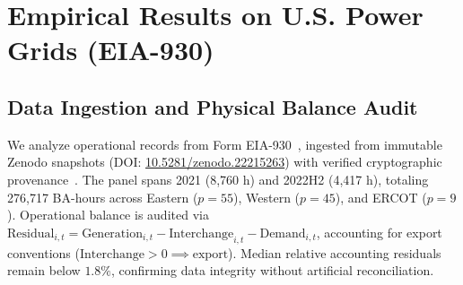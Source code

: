 \documentclass[10pt,twocolumn,journal]{article}
\begin{document}
\begin{table}[t]
\centering
\footnotesize
\renewcommand{\arraystretch}{0.90}
\setlength{\tabcolsep}{3.0pt}
\caption{\textbf{Comparative Baseline Benchmark on Dynamic Scale Transitions ($R=100$).} RMSE and exact $q_{90}$ accuracy comparing Proposed DCD ($h=36, N_{\text{eff}} \approx 128$) against Sliding PCA and Sliding Unregularized Spectrum ($w_{\text{len}}=128$). Benchmark DGP-K is a frozen hold-out ($p=10, 5 \to 2 \to 1$).}
\label{tab:baseline_comparison}
\end{table}

\section{Empirical Results on U.S. Power Grids (EIA-930)}

\subsection{Data Ingestion and Physical Balance Audit}
We analyze operational records from Form EIA-930~\cite{eia2024eia930}, ingested from immutable Zenodo snapshots (DOI: \href{https://doi.org/10.5281/zenodo.22215263}{10.5281/zenodo.22215263}) with verified cryptographic provenance~\cite{pudl2024zenodo}. The panel spans 2021 (8,760 h) and 2022H2 (4,417 h), totaling 276,717 BA-hours across Eastern ($p=55$), Western ($p=45$), and ERCOT ($p=9$). Operational balance is audited via $\text{Residual}_{i,t} = \text{Generation}_{i,t} - \text{Interchange}_{i,t} - \text{Demand}_{i,t}$, accounting for export conventions ($\text{Interchange} > 0 \implies \text{export}$). Median relative accounting residuals remain below $1.8\%$, confirming data integrity without artificial reconciliation.
\end{document}
